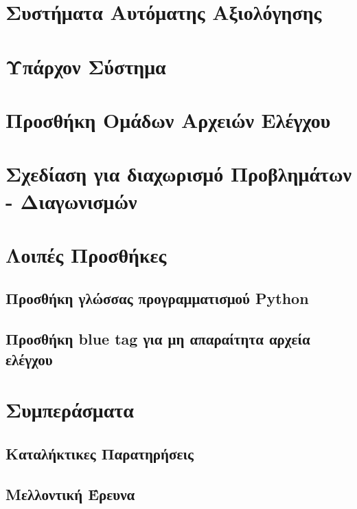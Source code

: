 \documentclass[diploma]{softlab-thesis}
\begin{document}
\chapter{Συστήματα Αυτόματης Αξιολόγησης}

\chapter{Υπάρχον Σύστημα}

\chapter{Προσθήκη Ομάδων Αρχειών Ελέγχου}

\chapter{Σχεδίαση για διαχωρισμό Προβλημάτων - Διαγωνισμών}

\chapter{Λοιπές Προσθήκες}

\section{Προσθήκη γλώσσας προγραμματισμού Python}

\section{Προσθήκη blue tag για μη απαραίτητα αρχεία ελέγχου}

\chapter{Συμπεράσματα}

\section{Καταλήκτικες Παρατηρήσεις}

\section{Μελλοντική Έρευνα}






\end{document}
